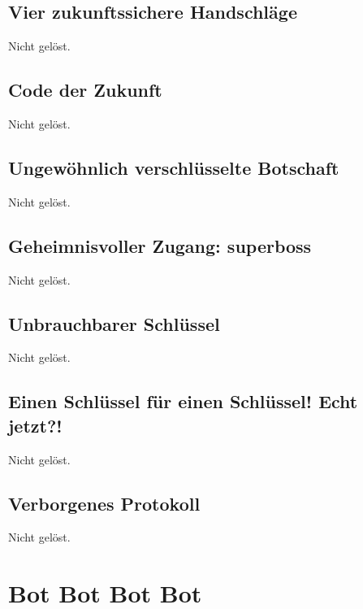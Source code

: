 \documentclass[12pt, a4paper, titlepage, oneside]{scrartcl}
\begin{document}
	\subsection{Vier zukunftssichere Handschl\"age}
	Nicht gelöst.

	\subsection{Code der Zukunft}
	Nicht gelöst.

	\subsection{Ungew\"ohnlich verschl\"usselte Botschaft}
	Nicht gelöst.

	\subsection{Geheimnisvoller Zugang: superboss}
	Nicht gelöst.

	\subsection{Unbrauchbarer Schl\"ussel}
	Nicht gelöst.

	\subsection{Einen Schl\"ussel f\"ur einen Schl\"ussel! Echt jetzt?!}
	Nicht gelöst.

	\subsection{Verborgenes Protokoll}
	Nicht gelöst.

	\section{Bot Bot Bot Bot}
\end{document}
